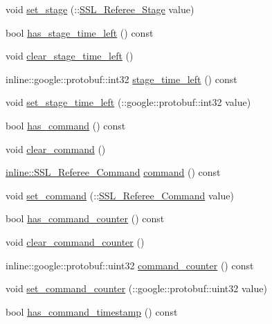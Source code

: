 \begin{DoxyCompactItemize}
\item 
void \hyperlink{class_s_s_l___referee_aaa3ddfeb19a26500b5a0e10279fe0602}{set\-\_\-stage} (\-::\hyperlink{referee_8pb_8h_a38b80041d0259d508796c1bc7ab57c4c}{S\-S\-L\-\_\-\-Referee\-\_\-\-Stage} value)
\item 
bool \hyperlink{class_s_s_l___referee_ad7b48dce931983627b4a9c508bd49481}{has\-\_\-stage\-\_\-time\-\_\-left} () const 
\item 
void \hyperlink{class_s_s_l___referee_a076fe385c3c162dc40d51d38c0089c4c}{clear\-\_\-stage\-\_\-time\-\_\-left} ()
\item 
inline\-::google\-::protobuf\-::int32 \hyperlink{class_s_s_l___referee_a2f81299040394f19d3f162cf7ef8e642}{stage\-\_\-time\-\_\-left} () const 
\item 
void \hyperlink{class_s_s_l___referee_afe664027a740c4ab78936dc6cad3c05b}{set\-\_\-stage\-\_\-time\-\_\-left} (\-::google\-::protobuf\-::int32 value)
\item 
bool \hyperlink{class_s_s_l___referee_ad13efbca3a7055d83a2ebdf3ffb64eb3}{has\-\_\-command} () const 
\item 
void \hyperlink{class_s_s_l___referee_a8dc579eacd86a7ad81290aa91a6a5581}{clear\-\_\-command} ()
\item 
\hyperlink{referee_8pb_8h_a25bd5aba081a4c85e54d6ed275358d79}{inline\-::\-S\-S\-L\-\_\-\-Referee\-\_\-\-Command} \hyperlink{class_s_s_l___referee_ae1385790522929609ee895fa3c752ddd}{command} () const 
\item 
void \hyperlink{class_s_s_l___referee_a22c8356a520740d18e49babd90edde73}{set\-\_\-command} (\-::\hyperlink{referee_8pb_8h_a25bd5aba081a4c85e54d6ed275358d79}{S\-S\-L\-\_\-\-Referee\-\_\-\-Command} value)
\item 
bool \hyperlink{class_s_s_l___referee_a4d6912b5487bfcf05cfa76aa1b77f39a}{has\-\_\-command\-\_\-counter} () const 
\item 
void \hyperlink{class_s_s_l___referee_a0625c5050f41243a72a1bd807f412189}{clear\-\_\-command\-\_\-counter} ()
\item 
inline\-::google\-::protobuf\-::uint32 \hyperlink{class_s_s_l___referee_a3c439296cb34b85d5652a939482c50ff}{command\-\_\-counter} () const 
\item 
void \hyperlink{class_s_s_l___referee_abc499854267e221e628f7ea8b94abb81}{set\-\_\-command\-\_\-counter} (\-::google\-::protobuf\-::uint32 value)
\item 
bool \hyperlink{class_s_s_l___referee_a95bf24c38340968b5efcab83d95eb72b}{has\-\_\-command\-\_\-timestamp} () const 

\end{DoxyCompactItemize}
